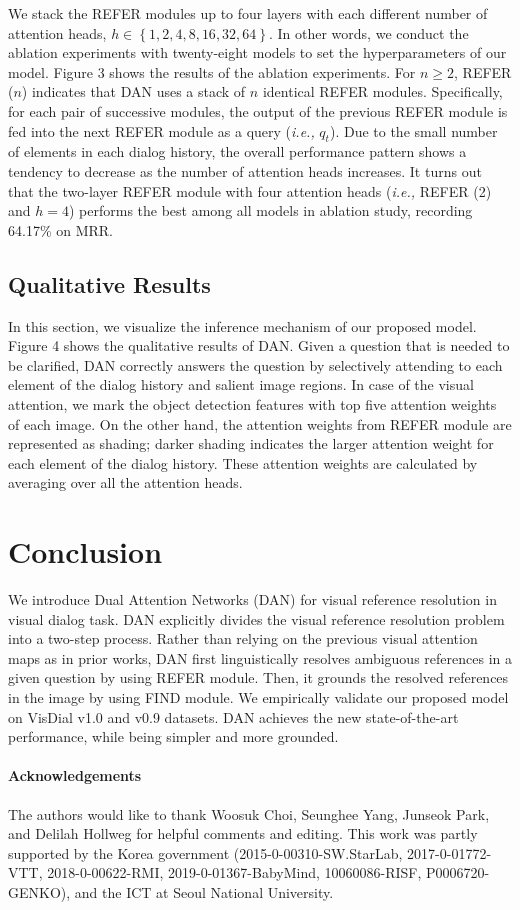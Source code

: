 \documentclass[11pt,a4paper]{article}
\begin{document}
We stack the REFER modules up to four layers with each different number of attention heads, $h \in \left\{1, 2, 4, 8, 16, 32, 64 \right\}$. In other words, we conduct the ablation experiments with twenty-eight models to set the hyperparameters of our model. Figure 3 shows the results of the ablation experiments. For $n \ge 2$, REFER ($n$) indicates that DAN uses a stack of $n$ identical REFER modules. Specifically, for each pair of successive modules, the output of the previous REFER module is fed into the next REFER module as a query ({\it i.e.,} $q_t$). Due to the small number of elements in each dialog history, the overall performance pattern shows a tendency to decrease as the number of attention heads increases. It turns out that the two-layer REFER module with four attention heads ({\it i.e.,} REFER (2) and $h=4$) performs the best among all models in ablation study, recording 64.17\% on MRR. 

\subsection{Qualitative Results}
\label{sec:qual}
In this section, we visualize the inference mechanism of our proposed model. Figure 4 shows the qualitative results of DAN. 
Given a question that is needed to be clarified, DAN correctly answers the question by selectively attending to each element of the dialog history and salient image regions. In case of the visual attention, we mark the object detection features with top five attention weights of each image. On the other hand, the attention weights from REFER module are represented as shading; darker shading indicates the larger attention weight for each element of the dialog history. These attention weights are calculated by averaging over all the attention heads. 

\section{Conclusion}
We introduce Dual Attention Networks (DAN) for visual reference resolution in visual dialog task. DAN explicitly divides the visual reference resolution problem into a two-step process. Rather than relying on the previous visual attention maps as in prior works, DAN first linguistically resolves ambiguous references in a given question by using REFER module. Then, it grounds the resolved references in the image by using FIND module. We empirically validate our proposed model on VisDial v1.0 and v0.9 datasets. DAN achieves the new state-of-the-art performance, while being simpler and more grounded.

\paragraph{Acknowledgements}
The authors would like to thank Woosuk Choi, Seunghee Yang, Junseok Park, and Delilah Hollweg for helpful comments and editing. This work was partly supported by the Korea government (2015-0-00310-SW.StarLab, 2017-0-01772-VTT, 2018-0-00622-RMI, 2019-0-01367-BabyMind, 10060086-RISF, P0006720-GENKO), and the ICT at Seoul National University.



\end{document}
